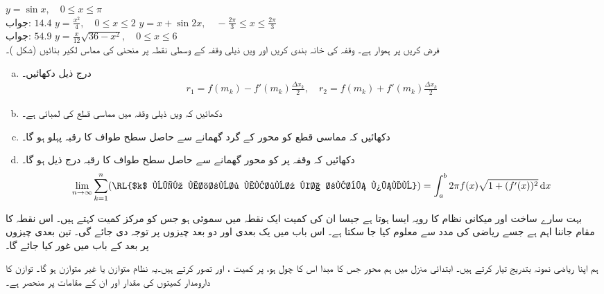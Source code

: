 $y=\sin x,\quad 0\le x\le \pi$\\
جواب:\quad
$14.4$
$y=\tfrac{x^2}{4},\quad 0\le x\le 2$
$y=x+\sin 2x,\quad -\tfrac{2\pi}{3}\le x\le \tfrac{2\pi}{3}$\\
جواب:\quad
$54.9$
$y=\tfrac{x}{12}\sqrt{36-x^2},\quad 0\le x\le 6$
\\
فرض کریں  پر  ہموار ہے۔ وقفہ  کی خانہ بندی کریں اور  ویں ذیلی وقفہ  کے وسطی نقطہ  پر منحنی کی مماس لکیر بنائیں (شکل )۔
\begin{enumerate}[a.]
\item
درج ذیل دکھائیں۔
\begin{align*}
r_1=f(m_k)-f'(m_k)\frac{\Delta x_k}{2},\quad r_2=f(m_k)+f'(m_k)\frac{\Delta x_k}{2}
\end{align*}
\item
دکھائیں کہ  ویں ذیلی وقفہ میں مماسی قطع کی لمبائی  ہے۔
\item
دکھائیں کہ مماسی قطع کو محور  کے گرد گھمانے سے حاصل سطح طواف کا رقبہ پہلو  ہو گا۔
\item
دکھائیں کہ وقفہ  پر  کو محور  گھمانے سے حاصل سطح طواف کا رقبہ درج ذیل ہو گا۔
\begin{align*}
\lim_{n\to \infty}\sum_{k=1}^n(\text{\RL{$k$ ویں مخروط مقطوع کا رقبہ پہلو}})=\int_a^b2\pi f(x)\sqrt{1+(f'(x))^2}\dif x
\end{align*}
\end{enumerate}

بہت سارے ساخت اور میکانی نظام کا رویہ ایسا ہوتا ہے جیسا ان کی کمیت ایک نقطہ میں سموئی   ہو جس کو مرکز کمیت کہتے ہیں۔ اس نقطہ کا مقام جاننا اہم ہے جسے ریاضی کی مدد سے معلوم کیا جا سکتا ہے۔ اس باب میں یک بعدی اور دو بعد چیزوں پر توجہ دی جائے گی۔ تین بعدی چیزوں پر بعد کے باب میں غور کیا جائے گا۔

ہم اپنا ریاضی نمونہ بتدریج تیار کرتے ہیں۔ ابتدائی منزل میں ہم  محور  جس کا مبدا اس کا چول ہو، پر کمیت ،  اور  تصور کرتے ہیں۔یہ نظام متوازن یا غیر متوازن ہو گا۔ توازن کا دارومدار کمیتوں کی مقدار اور ان کے مقامات پر منحصر ہے۔ 

